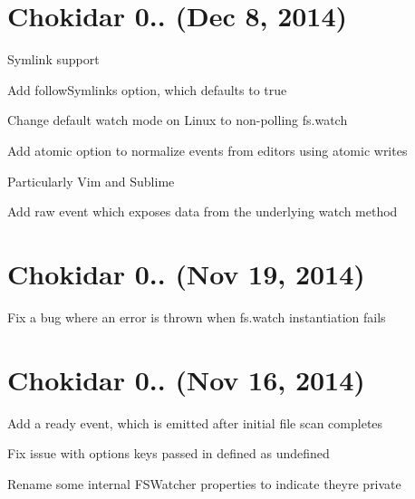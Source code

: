 \section*{Chokidar 0.. (Dec 8, 2014)}


\begin{DoxyItemize}
\item Symlink support
\begin{DoxyItemize}
\item Add {\ttfamily follow\+Symlinks} option, which defaults to {\ttfamily true}
\end{DoxyItemize}
\item Change default watch mode on Linux to non-\/polling {\ttfamily fs.\+watch}
\item Add {\ttfamily atomic} option to normalize events from editors using atomic writes
\begin{DoxyItemize}
\item Particularly Vim and Sublime
\end{DoxyItemize}
\item Add {\ttfamily raw} event which exposes data from the underlying watch method
\end{DoxyItemize}

\section*{Chokidar 0.. (Nov 19, 2014)}


\begin{DoxyItemize}
\item Fix a bug where an error is thrown when {\ttfamily fs.\+watch} instantiation fails
\end{DoxyItemize}

\section*{Chokidar 0.. (Nov 16, 2014)}


\begin{DoxyItemize}
\item Add a {\ttfamily ready} event, which is emitted after initial file scan completes
\item Fix issue with options keys passed in defined as {\ttfamily undefined}
\item Rename some internal {\ttfamily F\+S\+Watcher} properties to indicate they\textquotesingle{}re private
\end{DoxyItemize}

